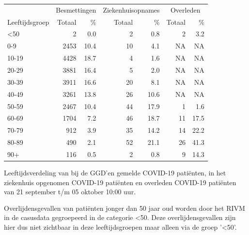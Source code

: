 \documentclass[
  english,
  man,floatsintext]{apa6}
\begin{document}
\begin{table}
\centering\begingroup\fontsize{11}{13}\selectfont

\begin{threeparttable}
\begin{tabular}{lrrrrrr}
\toprule
\multicolumn{1}{c}{ } & \multicolumn{2}{c}{Besmettingen} & \multicolumn{2}{c}{Ziekenhuisopnames} & \multicolumn{2}{c}{Overleden} \\
\cmidrule(l{3pt}r{3pt}){2-3} \cmidrule(l{3pt}r{3pt}){4-5} \cmidrule(l{3pt}r{3pt}){6-7}
Leeftijdsgroep & Totaal & \% & Totaal & \% & Totaal & \%\\
\midrule
<50 & 2 & 0.0 & 2 & 0.8 & 2 & 3.2\\
0-9 & 2453 & 10.4 & 10 & 4.1 & NA & NA\\
10-19 & 4428 & 18.7 & 4 & 1.6 & NA & NA\\
20-29 & 3881 & 16.4 & 5 & 2.0 & NA & NA\\
30-39 & 3911 & 16.6 & 20 & 8.1 & NA & NA\\
40-49 & 3261 & 13.8 & 26 & 10.6 & NA & NA\\
50-59 & 2467 & 10.4 & 44 & 17.9 & 1 & 1.6\\
60-69 & 1704 & 7.2 & 46 & 18.7 & 11 & 17.5\\
70-79 & 912 & 3.9 & 35 & 14.2 & 14 & 22.2\\
80-89 & 490 & 2.1 & 52 & 21.1 & 26 & 41.3\\
90+ & 116 & 0.5 & 2 & 0.8 & 9 & 14.3\\
\bottomrule
\end{tabular}
\begin{tablenotes}
\item[1] Leeftijdsverdeling van bij de GGD’en gemelde COVID-19 patiënten, in het ziekenhuis opgenomen COVID-19 patiënten en overleden COVID-19 patiënten van 21 september t/m 05 oktober 10:00 uur.
\item[2] Overlijdensgevallen van patiënten jonger dan 50 jaar oud worden door het RIVM in de casusdata gegroepeerd in de categorie <50. Deze overlijdensgevallen zijn hier dus niet zichtbaar in deze leeftijdsgroepen maar alleen via de groep '<50'.
\end{tablenotes}
\end{threeparttable}
\endgroup{}
\end{table}

\newpage
\end{document}
